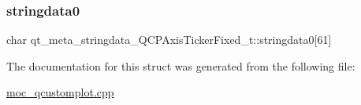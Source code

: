 \subsubsection{\texorpdfstring{stringdata0}{stringdata0}}
{\footnotesize\ttfamily char qt\+\_\+meta\+\_\+stringdata\+\_\+\+Q\+C\+P\+Axis\+Ticker\+Fixed\+\_\+t\+::stringdata0\mbox{[}61\mbox{]}}



The documentation for this struct was generated from the following file\+:\begin{DoxyCompactItemize}
\item 
\mbox{\hyperlink{moc__qcustomplot_8cpp}{moc\+\_\+qcustomplot.\+cpp}}\end{DoxyCompactItemize}
